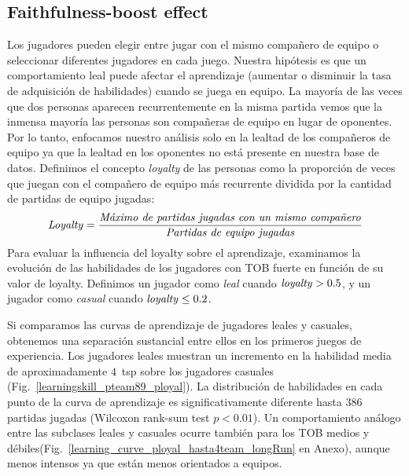 \documentclass[a4paper,11pt]{book}
\theoremstyle{definition}
\begin{document}
\subsection{Faithfulness-boost effect}

Los jugadores pueden elegir entre jugar con el mismo compa\~nero de equipo o seleccionar diferentes jugadores en cada juego.
%
Nuestra hip\'otesis es que un comportamiento leal puede afectar el aprendizaje (aumentar o disminuir la tasa de adquisici\'on de habilidades) cuando se juega en equipo.
%
La mayor\'ia de las veces que dos personas aparecen recurrentemente en la misma partida vemos que la inmensa mayor\'ia las personas son compa\~neras de equipo en lugar de oponentes.
%
Por lo tanto, enfocamos nuestro an\'alisis solo en la lealtad de los compa\~neros de equipo ya que la lealtad en los oponentes no est\'a presente en nuestra base de datos.
%
Definimos el concepto \emph{loyalty} de las personas como la proporci\'on de veces que juegan con el compa\~nero de equipo m\'as recurrente dividida por la cantidad de partidas de equipo jugadas:
%
\begin{equation}
\text{\emph{Loyalty}} = \frac{\text{\emph{M\'aximo de partidas jugadas con un mismo compa\~nero}}}{\text{\emph{Partidas de equipo jugadas}}}
\end{equation}
%
Para evaluar la influencia del loyalty sobre el aprendizaje, examinamos la evoluci\'on de las habilidades de los jugadores con TOB fuerte en funci\'on de su valor de loyalty.
%
Definimos un jugador como \emph{leal} cuando $\text{\emph{loyalty}}>0.5$, y un jugador como \emph{casual} cuando $\text{\emph{loyalty}}\leq 0.2$.


Si comparamos las curvas de aprendizaje de jugadores leales y casuales, obtenemos una separaci\'on sustancial entre ellos en los primeros juegos de experiencia.
%
Los jugadores leales muestran un incremento en la habilidad media de aproximadamente $4$~tsp sobre los jugadores casuales (Fig.~\ref{learningskill_pteam89_ployal}).
%
La distribuci\'on de habilidades en cada punto de la curva de aprendizaje es significativamente diferente hasta $386$ partidas jugadas (Wilcoxon rank-sum test $p<0.01$).
%
Un comportamiento an\'alogo entre las subclases leales y casuales ocurre tambi\'en para los TOB medios y d\'ebiles(Fig.~\ref{learning_curve_ployal_hasta4team_longRun} en Anexo), aunque menos intensos ya que est\'an menos orientados a equipos.

\end{document}
